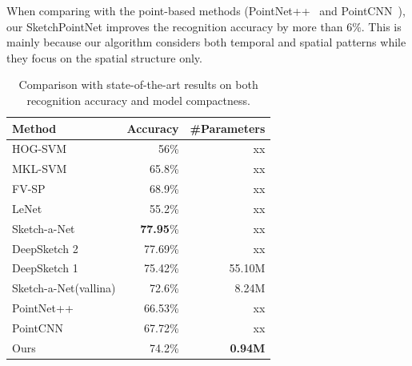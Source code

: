 When comparing with the point-based methods (PointNet++~\cite{qi2017pointnetplusplus} and PointCNN~\cite{1801.07791}), our SketchPointNet improves the recognition accuracy by more than $6\%$. 
This is mainly because our algorithm considers both temporal and spatial patterns while they focus on the spatial structure only. 



\begin{table}[htbp]
\centering
\caption{Comparison with state-of-the-art results on both recognition accuracy and model compactness.}
\label{tb:acc-size}
\begin{tabular}{l|rr}
    \hline
     Method & Accuracy & \#Parameters\\
    \hline
     HOG-SVM \cite{Eitz2012HowDH}& 56\% & xx \\
     MKL-SVM \cite{LiHSG15} & 65.8\%  & xx \\
     FV-SP \cite{Schneider2014SketchCA} & 68.9\%  & xx\\
     LeNet \cite{LeCun1998GradientbasedLA}& 55.2\%  & xx\\
     \hline
     Sketch-a-Net \cite{Yu2015SketchaNetTB}& \textbf{77.95}\%  & xx\\
     DeepSketch 2 \cite{Dupont2016DeepSketch2D}& 77.69\%  & xx\\
     \hline
     DeepSketch 1 \cite{Seddati2015DeepSketchDC}& 75.42\%  & 55.10M\\
     Sketch-a-Net(vallina) \cite{Yu2015SketchaNetTB}& 72.6\% & 8.24M \\
     \hline
     PointNet++ \cite{qi2017pointnetplusplus}& 66.53\%  & xx\\
     PointCNN \cite{1801.07791}& 67.72\%  & xx\\
     Ours& 74.2\%  & \textbf{0.94M}\\
    \hline
\end{tabular}
\end{table}



